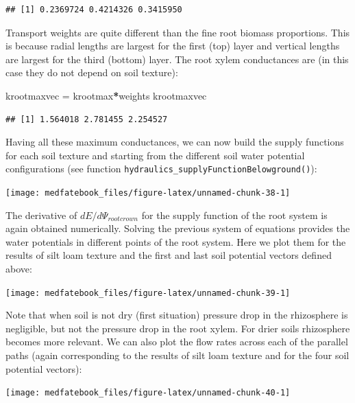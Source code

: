 \documentclass[]{book}
\newenvironment{Shaded}{\begin{snugshade}}{\end{snugshade}}
\newcommand{\StringTok}[1]{\textcolor[rgb]{0.31,0.60,0.02}{#1}}
\newcommand{\OperatorTok}[1]{\textcolor[rgb]{0.81,0.36,0.00}{\textbf{#1}}}
\newcommand{\NormalTok}[1]{#1}
\begin{document}
\begin{verbatim}
## [1] 0.2369724 0.4214326 0.3415950
\end{verbatim}

Transport weights are quite different than the fine root biomass
proportions. This is because radial lengths are largest for the first
(top) layer and vertical lengths are largest for the third (bottom)
layer. The root xylem conductances are (in this case they do not depend
on soil texture):

\begin{Shaded}
\begin{Highlighting}[]
\NormalTok{krootmaxvec =}\StringTok{ }\NormalTok{krootmax}\OperatorTok{*}\NormalTok{weights}
\NormalTok{krootmaxvec}
\end{Highlighting}
\end{Shaded}

\begin{verbatim}
## [1] 1.564018 2.781455 2.254527
\end{verbatim}

Having all these maximum conductances, we can now build the supply
functions for each soil texture and starting from the different soil
water potential configurations (see function
\texttt{hydraulics\_supplyFunctionBelowground()}):

\begin{center}\texttt{[image: medfatebook\_files/figure-latex/unnamed-chunk-38-1]} \end{center}

The derivative of \(dE/d\Psi_{rootcrown}\) for the supply function of
the root system is again obtained numerically. Solving the previous
system of equations provides the water potentials in different points of
the root system. Here we plot them for the results of silt loam texture
and the first and last soil potential vectors defined above:

\begin{center}\texttt{[image: medfatebook\_files/figure-latex/unnamed-chunk-39-1]} \end{center}

Note that when soil is not dry (first situation) pressure drop in the
rhizosphere is negligible, but not the pressure drop in the root xylem.
For drier soils rhizosphere becomes more relevant. We can also plot the
flow rates across each of the parallel paths (again corresponding to the
results of silt loam texture and for the four soil potential vectors):

\begin{center}\texttt{[image: medfatebook\_files/figure-latex/unnamed-chunk-40-1]} \end{center}
\end{document}
